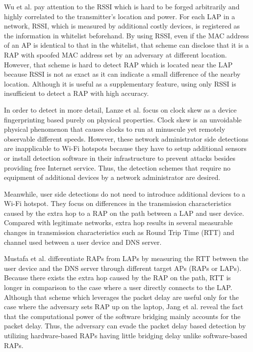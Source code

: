 \documentclass[conference]{IEEEtran}
\begin{document}
Wu et al. \cite{prapd} pay attention to the RSSI which is hard to be forged arbitrarily and highly correlated to the transmitter's location and power.
For each LAP in a network, RSSI, which is measured by additional costly devices, is registered as the information in whitelist beforehand.
By using RSSI, even if the MAC address of an AP is identical to that in the whitelist, that scheme can disclose that it is a RAP with spoofed MAC address set by an adversary at different location.
However, that scheme is hard to detect RAP which is located near the LAP because RSSI is not as exact as it can indicate a small difference of the nearby location. 
Although it is useful as a supplementary feature, using only RSSI is insufficient to detect a RAP with high accuracy.

In order to detect in more detail, Lanze et al. \cite{clockskew} focus on clock skew as a device fingerprinting based purely on physical properties.
Clock skew is an unvoidable physical phenomenon that causes clocks to run at minuscule yet remotely observable different speeds.
However, these network administrator side detections are inapplicable to Wi-Fi hotspots because they have to setup additional sensors or install detection software in their infrastructure to prevent attacks besides providing free Internet service.
Thus, the detection schemes that require no equipment of additional devices by a network administrator are desired.

Meanwhile, user side detections do not need to introduce additional devices to a Wi-Fi hotspot. 
They focus on differences in the transmission characteristics caused by the extra hop to a RAP on the path between a LAP and user device. 
Compared with legitimate networks, extra hop results in several measurable changes in transmission characteristics such as Round Trip Time (RTT) and channel used between a user device and DNS server.

Mustafa et al. \cite{rtt} differentiate RAPs from LAPs by measuring the RTT between the user device and the DNS server through different target APs (RAPs or LAPs).
Because there exists the extra hop caused by the RAP on the path, RTT is longer in comparison to the case where a user directly connects to the LAP.
Although that scheme which leverages the packet delay are useful only for the case where the adversary sets RAP up on the laptop, Jang et al. \cite{previous} reveal the fact that the computational power of the software bridging mainly accounts for the packet delay.
Thus, the adversary can evade the packet delay based detection by utilizing hardware-based RAPs having little bridging delay unlike software-based RAPs.
\end{document}
